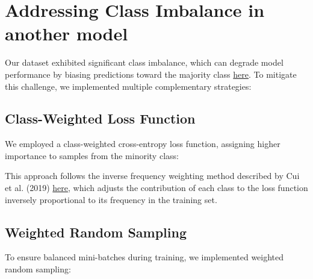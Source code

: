 \documentclass[a4paper,12pt]{article}
\begin{document}
\section{Addressing Class Imbalance in another model}

Our dataset exhibited significant class imbalance, which can degrade model performance by biasing predictions toward the majority class \href{https://journalofbigdata.springeropen.com/articles/10.1186/s40537-019-0192-5}{here}. To mitigate this challenge, we implemented multiple complementary strategies:

\subsection{Class-Weighted Loss Function}
We employed a class-weighted cross-entropy loss function, assigning higher importance to samples from the minority class:



This approach follows the inverse frequency weighting method described by Cui et al. (2019) \href{https://openaccess.thecvf.com/content_CVPR_2019/papers/Cui_Class-Balanced_Loss_Based_on_Effective_Number_of_Samples_CVPR_2019_paper.pdf}{here}, which adjusts the contribution of each class to the loss function inversely proportional to its frequency in the training set.

\subsection{Weighted Random Sampling}
To ensure balanced mini-batches during training, we implemented weighted random sampling:


\end{document}
